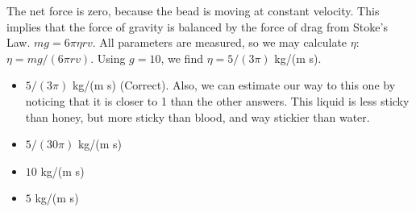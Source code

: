 \documentclass[10pt]{article}
\begin{document}
\begin{enumerate}
The net force is zero, because the bead is moving at constant velocity.  This implies that the force of gravity is balanced by the force of drag from Stoke's Law.  $mg = 6\pi\eta r v$.  All parameters are measured, so we may calculate $\eta$: $\eta = mg/(6\pi r v)$.  Using $g = 10$, we find $\eta = 5/(3\pi)$ kg/(m s).
\begin{itemize}
\item $5/(3\pi)$ kg/(m s) (Correct).  Also, we can estimate our way to this one by noticing that it is closer to 1 than the other answers.  This liquid is less sticky than honey, but more sticky than blood, and way stickier than water.
\item $5/(30\pi)$ kg/(m s)
\item $10$ kg/(m s)
\item $5$ kg/(m s)
\end{itemize}
\end{enumerate}
\end{document}
